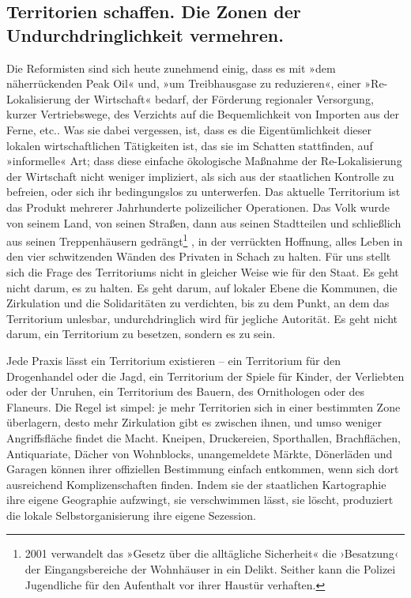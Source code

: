 \subsection{Territorien schaffen. Die Zonen der Undurchdringlichkeit vermehren.}

Die Reformisten sind sich heute zunehmend einig, dass es mit »dem
näherrückenden Peak Oil« und, »um Treibhausgase zu reduzieren«,
einer »Re-Lokalisierung der Wirtschaft« bedarf, der Förderung
regionaler Versorgung, kurzer Vertriebswege, des Verzichts auf die
Bequemlichkeit von Importen aus der Ferne, etc.. Was sie dabei
vergessen, ist, dass es die Eigentümlichkeit dieser lokalen
wirtschaftlichen Tätigkeiten ist, das sie im Schatten stattfinden,
auf »informelle« Art; dass diese einfache ökologische Maßnahme der
Re-Lokalisierung der Wirtschaft nicht weniger impliziert, als sich
aus der staatlichen Kontrolle zu befreien, oder sich ihr
bedingungslos zu unterwerfen.
Das aktuelle Territorium ist das Produkt mehrerer Jahrhunderte
polizeilicher Operationen. Das Volk wurde von seinem Land, von
seinen Straßen, dann aus seinen Stadtteilen und schließlich aus
seinen Treppenhäusern gedrängt\footnote{
2001 verwandelt das »Gesetz über die alltägliche Sicherheit« die
›Besatzung‹ der Eingangsbereiche der Wohnhäuser in ein Delikt.
Seither kann die Polizei Jugendliche für den Aufenthalt vor ihrer
Haustür verhaften.
}%
, in der verrückten Hoffnung, alles
Leben in den vier schwitzenden Wänden des Privaten in Schach zu
halten. Für uns stellt sich die Frage des Territoriums nicht in
gleicher Weise wie für den Staat. Es geht nicht darum, es zu
halten. Es geht darum, auf lokaler Ebene die Kommunen, die
Zirkulation und die Solidaritäten zu verdichten, bis zu dem Punkt,
an dem das Territorium unlesbar, undurchdringlich wird für jegliche
Autorität. Es geht nicht darum, ein Territorium zu besetzen,
sondern es zu sein.

Jede Praxis lässt ein Territorium existieren – ein Territorium für
den Drogenhandel oder die Jagd, ein Territorium der Spiele für
Kinder, der Verliebten oder der Unruhen, ein Territorium des
Bauern, des Ornithologen oder des Flaneurs. Die Regel ist simpel:
je mehr Territorien sich in einer bestimmten Zone überlagern, desto
mehr Zirkulation gibt es zwischen ihnen, und umso weniger
Angriffsfläche findet die Macht. Kneipen, Druckereien, Sporthallen,
Brachflächen, Antiquariate, Dächer von Wohnblocks, unangemeldete
Märkte, Dönerläden und Garagen können ihrer offiziellen Bestimmung
einfach entkommen, wenn sich dort ausreichend Komplizenschaften
finden. Indem sie der staatlichen Kartographie ihre eigene
Geographie aufzwingt, sie verschwimmen lässt, sie löscht,
produziert die lokale Selbstorganisierung ihre eigene Sezession.

